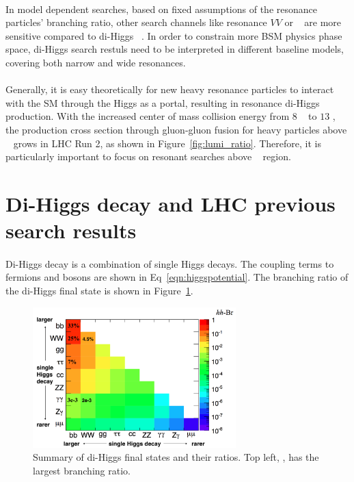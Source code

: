 \paragraph{}
In model dependent searches, based on fixed assumptions of the resonance particles' branching ratio, other search channels like resonance $VV$ or \ttbar~ are more sensitive compared to di-Higgs ~\cite{Cavaliere:2203605}. In order to constrain more BSM physics phase space, di-Higgs search restuls need to be interpreted in different baseline models, covering both narrow and wide resonances.

\paragraph{}
Generally, it is easy theoretically for new heavy resonance particles to interact with the SM through the Higgs as a portal, resulting in resonance di-Higgs production. With the increased center of mass collision energy from $8$ \TeV~ to $13$ \TeV, the production cross section through gluon-gluon fusion for heavy particles above \TeV~ grows in LHC Run 2, as shown in Figure~\ref{fig:lumi_ratio}. Therefore, it is particularly important to focus on resonant searches above \TeV~ region.


\section{Di-Higgs decay and LHC previous search results}
\paragraph{}
Di-Higgs decay is a combination of single Higgs decays. The coupling terms to fermions and bosons are shown in Eq~\ref{eqn:higgspotential}. The branching ratio of the di-Higgs final state is shown in Figure~\ref{fig:HH_BR}.

\begin{figure}[h!]
  \centering
  \includegraphics[width=0.7\textwidth]{figures/theory/HH_BR}
  \caption{Summary of di-Higgs final states and their ratios. Top left, \bbbb, has the largest branching ratio.}
  \label{fig:HH_BR}
\end{figure}

